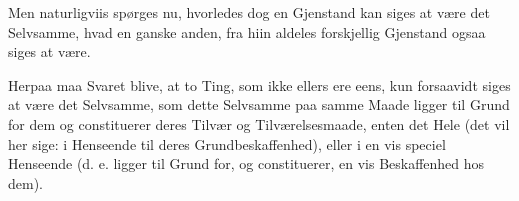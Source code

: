 \documentclass[12pt]{book}
\begin{document}
Men naturligviis spørges nu, hvorledes dog en Gjenstand kan siges at være det
Selvsamme, hvad en ganske anden, fra hiin aldeles forskjellig Gjenstand ogsaa
siges at være.

Herpaa maa Svaret blive, at to Ting, som ikke ellers ere eens, kun forsaavidt
siges at være det Selvsamme, som dette Selvsamme paa samme Maade ligger til
Grund for dem og constituerer deres Tilvær og Tilværelsesmaade, enten det Hele
(det vil her sige: i Henseende til deres Grundbeskaffenhed), eller i en vis
speciel Henseende (d. e. ligger til Grund for, og constituerer, en vis
Beskaffenhed hos dem).
\end{document}
